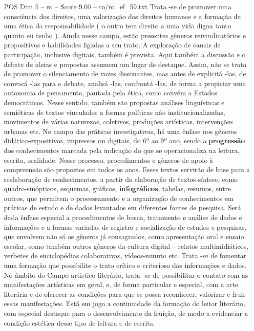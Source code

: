 \begin{textsample}{POS Dim 5 – ro – Score 9.00 – ro/ro\_ef\_59.txt}
Trata -se de promover uma consciência dos direitos, uma valorização dos direitos humanos e a formação de uma ética da responsabilidade ( o outro tem direito a uma vida digna tanto quanto eu tenho ).
Ainda nesse campo, estão presentes gêneros reivindicatórios e propositivos e habilidades ligadas a seu trato.
A exploração de canais de participação, inclusive digitais, também é prevista.
Aqui também a discussão e o debate de ideias e propostas assumem um lugar de destaque.
Assim, não se trata de promover o silenciamento de vozes dissonantes, mas antes de explicitá -las, de convocá -las para o debate, analisá -las, confrontá -las, de forma a propiciar uma autonomia de pensamento, pautada pela ética, como convém a Estados democráticos.
Nesse sentido, também são propostas análises linguísticas e semióticas de textos vinculados a formas políticas não institucionalizadas, movimentos de várias naturezas, coletivos, produções artísticas, intervenções urbanas etc.
No campo das práticas investigativas, há uma ênfase nos gêneros didático-expositivos, impressos ou digitais, do 6º ao 9º ano, sendo a \textbf{progressão} dos conhecimentos marcada pela indicação do que se operacionaliza na leitura, escrita, oralidade.
Nesse processo, procedimentos e gêneros de apoio à compreensão são propostos em todos os anos.
Esses textos servirão de base para a reelaboração de conhecimentos, a partir da elaboração de textos-síntese, como quadro-sinópticos, esquemas, gráficos, \textbf{infográficos}, tabelas, resumos, entre outros, que permitem o processamento e a organização de conhecimentos em práticas de estudo e de dados levantados em diferentes fontes de pesquisa.
Será dada ênfase especial a procedimentos de busca, tratamento e análise de dados e informações e a formas variadas de registro e socialização de estudos e pesquisas, que envolvem não só os gêneros já consagrados, como apresentação oral e ensaio escolar, como também outros gêneros da cultura digital – relatos multimidiáticos, verbetes de enciclopédias colaborativas, vídeos-minuto etc.
Trata -se de fomentar uma formação que possibilite o trato crítico e criterioso das informações e dados.
No âmbito do Campo artístico-literário, trata -se de possibilitar o contato com as manifestações artísticas em geral, e, de forma particular e especial, com a arte literária e de oferecer as condições para que se possa reconhecer, valorizar e fruir essas manifestações.
Está em jogo a continuidade da formação do leitor literário, com especial destaque para o desenvolvimento da fruição, de modo a evidenciar a condição estética desse tipo de leitura e de escrita.

\end{textsample}
